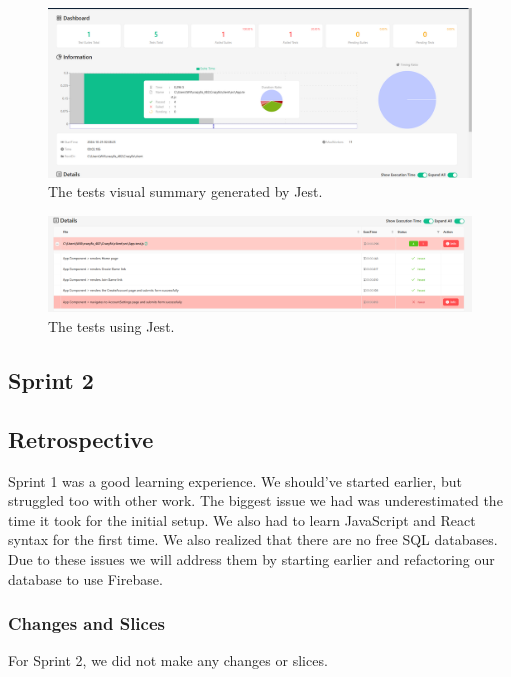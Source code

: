 \documentclass{article}
\begin{document}
\begin{figure}[h]
\centering
\includegraphics[width=\linewidth]{tests1.png}
\caption{\label{fig:test1}The tests visual summary generated by Jest.}
\end{figure}

\begin{figure}[h]
\centering
\includegraphics[width=\linewidth]{tests2.png}
\caption{\label{fig:test2}The tests using Jest.}
\end{figure}

\subsection{Sprint 2}

\begin{tcolorbox}[colback=blue!10, colframe=blue, boxrule=0.5mm, sharp corners=south]
\subsection{Retrospective}
Sprint 1 was a good learning experience. We should've started earlier, but struggled too with other work. The biggest issue we had was underestimated the time it took for the initial setup. We also had to learn JavaScript and React syntax for the first time. We also realized that there are no free SQL databases. Due to these issues we will address them by starting earlier and refactoring our database to use Firebase.
\end{tcolorbox}

\subsubsection{Changes and Slices}
For Sprint 2, we did not make any changes or slices.
\end{document}
